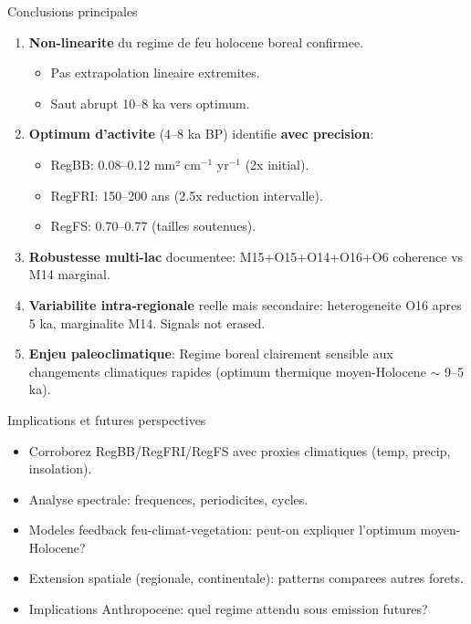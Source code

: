 \documentclass[aspectratio=169,11pt]{beamer}
\begin{document}
\begin{frame}{Conclusions principales}
\begin{enumerate}
  \item \textbf{Non-linearite} du regime de feu holocene boreal confirmee.
  \begin{itemize}
    \item Pas extrapolation lineaire extremites.
    \item Saut abrupt 10--8 ka vers optimum.
  \end{itemize}
  
  \item \textbf{Optimum d'activite} (4--8 ka BP) identifie \textbf{avec precision}:
  \begin{itemize}
    \item RegBB: 0.08--0.12 mm² cm$^{-1}$ yr$^{-1}$ (2x initial).
    \item RegFRI: 150--200 ans (2.5x reduction intervalle).
    \item RegFS: 0.70--0.77 (tailles soutenues).
  \end{itemize}
  
  \item \textbf{Robustesse multi-lac} documentee: M15+O15+O14+O16+O6 coherence vs M14 marginal.
  
  \item \textbf{Variabilite intra-regionale} reelle mais secondaire: heterogeneite O16 apres 5 ka, marginalite M14. Signals not erased.
  
  \item \textbf{Enjeu paleoclimatique}: Regime boreal clairement sensible aux changements climatiques rapides (optimum thermique moyen-Holocene $\sim$ 9--5 ka).
\end{enumerate}
\end{frame}

\begin{frame}{Implications et futures perspectives}
\begin{itemize}
  \item Corroborez RegBB/RegFRI/RegFS avec proxies climatiques (temp, precip, insolation).
  
  \item Analyse spectrale: frequences, periodicites, cycles.
  
  \item Modeles feedback feu-climat-vegetation: peut-on expliquer l'optimum moyen-Holocene?
  
  \item Extension spatiale (regionale, continentale): patterns comparees autres forets.
  
  \item Implications Anthropocene: quel regime attendu sous emission futures?
\end{itemize}
\end{frame}
\end{document}
